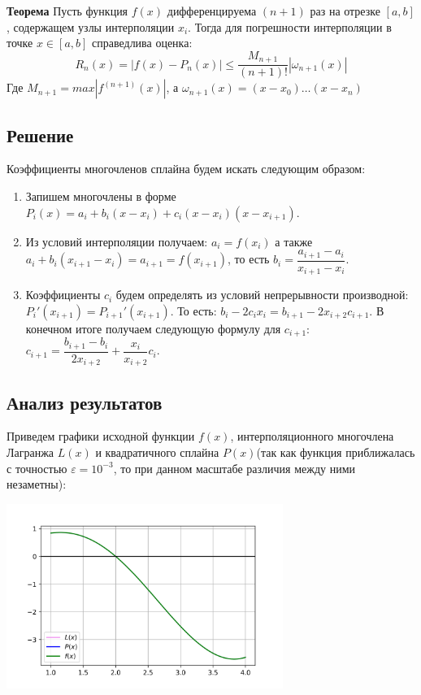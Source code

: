 \textbf{Теорема}{
	Пусть функция $f(x)$ дифференцируема $(n+1)$ раз на отрезке $[a, b]$, содержащем узлы интерполяции $x_i$. Тогда для погрешности интерполяции в точке $x \in [a, b]$ справедлива оценка:
	\[
		R_n(x) = |f(x) - P_n(x)| \leq \dfrac{M_{n+1}}{(n+1)!}|\omega_{n+1}(x)|
	\]
	Где $M_{n+1} = max|f^{(n+1)}(x)|$, а $\omega_{n+1}(x) = (x - x_0)\dots(x - x_n)$
}

\subsection*{Решение}

Коэффициенты многочленов сплайна будем искать следующим образом:

\begin{enumerate}
	\item Запишем многочлены в форме $P_i(x) = a_i + b_i(x - x_i) + c_i(x - x_i)(x - x_{i+1})$.
	\item Из условий интерполяции получаем: $a_i = f(x_i)$ а также $a_i + b_i(x_{i+1} - x_i) = a_{i+1} = f(x_{i+1})$, то есть $b_i = \dfrac{a_{i+1} - a_i}{x_{i+1} - x_i}$.
	\item Коэффициенты $c_i$ будем определять из условий непрерывности производной: $P_i'(x_{i+1}) = P_{i+1}'(x_{i+1})$. То есть: $b_i - 2c_ix_i = b_{i+1} - 2x_{i+2}c_{i+1}$. В конечном итоге получаем следующую формулу для $c_{i+1}$: $c_{i+1} = \dfrac{b_{i+1} - b_i}{2x_{i+2}} + \dfrac{x_i}{x_{i+2}}c_i$.
\end{enumerate}
\newpage
\subsection*{Анализ результатов}
Приведем графики исходной функции $f(x)$, интерполяционного многочлена Лагранжа $L(x)$ и квадратичного сплайна $P(x)$(так как функция приближалась с точностью  $\varepsilon=10^{-3}$, то при данном масштабе различия между ними незаметны):

\includegraphics[height=6cm]{images/plot_4.2_all_inter.png}

